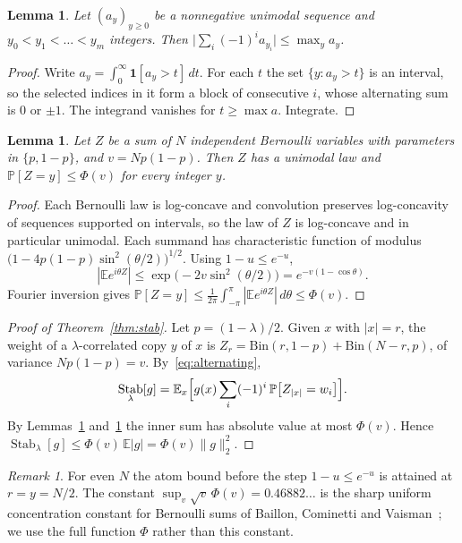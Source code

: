 \documentclass[11pt]{amsart}
\newtheorem{lemma}[theorem]{Lemma}
\theoremstyle{definition}
\theoremstyle{remark}
\newtheorem{remark}[theorem]{Remark}
\newcommand{\E}{\mathbb E}
\renewcommand{\P}{\mathbb P}
\DeclareMathOperator{\Stab}{Stab}
\begin{document}
\begin{lemma}\label{lem:unimodal}
Let $(a_y)_{y\ge0}$ be a nonnegative unimodal sequence and $y_0<y_1<\dots<y_m$ integers. Then $\bigl|\sum_i(-1)^ia_{y_i}\bigr|\le\max_ya_y$.
\end{lemma}

\begin{proof}
Write $a_y=\int_0^\infty\mathbf 1[a_y>t]\,dt$. For each $t$ the set $\{y:a_y>t\}$ is an interval, so the selected indices in it form a block of consecutive $i$, whose alternating sum is $0$ or $\pm1$. The integrand vanishes for $t\ge\max a$. Integrate.
\end{proof}

\begin{lemma}\label{lem:atom}
Let $Z$ be a sum of $N$ independent Bernoulli variables with parameters in $\{p,1-p\}$, and $v=Np(1-p)$. Then $Z$ has a unimodal law and $\P[Z=y]\le\Phi(v)$ for every integer $y$.
\end{lemma}

\begin{proof}
Each Bernoulli law is log-concave and convolution preserves log-concavity of sequences supported on intervals, so the law of $Z$ is log-concave and in particular unimodal. Each summand has characteristic function of modulus $\bigl(1-4p(1-p)\sin^2(\theta/2)\bigr)^{1/2}$. Using $1-u\le e^{-u}$,
\[
 |\E e^{i\theta Z}|\le\exp\bigl(-2v\sin^2(\theta/2)\bigr)=e^{-v(1-\cos\theta)}.
\]
Fourier inversion gives $\P[Z=y]\le\frac1{2\pi}\int_{-\pi}^\pi|\E e^{i\theta Z}|\,d\theta\le\Phi(v)$.
\end{proof}

\begin{proof}[Proof of Theorem~\ref{thm:stab}]
Let $p=(1-\lambda)/2$. Given $x$ with $|x|=r$, the weight of a $\lambda$-correlated copy $y$ of $x$ is $Z_r=\mathrm{Bin}(r,1-p)+\mathrm{Bin}(N-r,p)$, of variance $Np(1-p)=v$. By~\eqref{eq:alternating},
\[
 \Stab_\lambda[g]=\E_x\Bigl[g(x)\sum_i(-1)^i\,\P\bigl[Z_{|x|}=w_i\bigr]\Bigr].
\]
By Lemmas~\ref{lem:unimodal} and~\ref{lem:atom} the inner sum has absolute value at most $\Phi(v)$. Hence $\Stab_\lambda[g]\le\Phi(v)\,\E|g|=\Phi(v)\|g\|_2^2$.
\end{proof}

\begin{remark}
For even $N$ the atom bound before the step $1-u\le e^{-u}$ is attained at $r=y=N/2$. The constant $\sup_v\sqrt v\,\Phi(v)=0.46882\ldots$ is the sharp uniform concentration constant for Bernoulli sums of Baillon, Cominetti and Vaisman~\cite{BCV16}; we use the full function $\Phi$ rather than this constant.
\end{remark}
\end{document}
